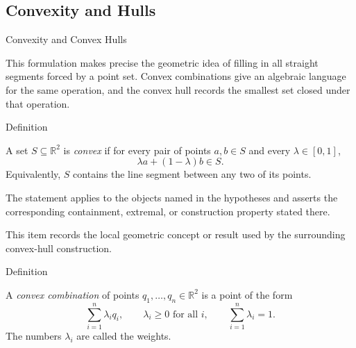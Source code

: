 
\subsection*{Convexity and Hulls}

\begin{topicbox}{Convexity and Convex Hulls}
\begin{exposition}
This formulation makes precise the geometric idea of filling in all straight
segments forced by a point set. Convex combinations give an algebraic language
for the same operation, and the convex hull records the smallest set closed
under that operation.
\end{exposition}

\begin{definitionbox}{Definition}
\begin{definition}
\label{def:computational-geometry-convex-set}
A set \(S \subseteq \mathbb{R}^2\) is \emph{convex} if for every pair of points
\(a,b\in S\) and every \(\lambda\in[0,1]\),
\[
  \lambda a+(1-\lambda)b\in S.
\]
Equivalently, \(S\) contains the line segment between any two of its points.
\end{definition}
\end{definitionbox}

\begin{remark*}
The statement applies to the objects named in the hypotheses and asserts the
corresponding containment, extremal, or construction property stated there.
\end{remark*}

\begin{remark*}[Interpretation]
This item records the local geometric concept or result used by the surrounding
convex-hull construction.
\end{remark*}

\DefinitionalRoot

\begin{definitionbox}{Definition}
\begin{definition}
\label{def:computational-geometry-convex-combination}
A \emph{convex combination} of points
\(q_1,\dots,q_n\in\mathbb{R}^2\) is a point of the form
\[
  \sum_{i=1}^{n}\lambda_i q_i,
  \qquad
  \lambda_i\ge 0 \text{ for all } i,
  \qquad
  \sum_{i=1}^{n}\lambda_i=1.
\]
The numbers \(\lambda_i\) are called the weights.
\end{definition}
\end{definitionbox}


\end{topicbox}
